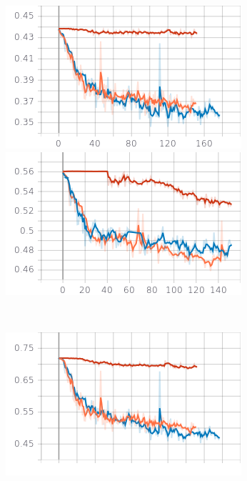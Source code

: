 \documentclass{article}
\begin{document}
\begin{figure}[hbt!]
	\begin{minipage}{.5\textwidth}
	  \centering
	  \includegraphics[width=\linewidth]{images/doa_score_ov1.png}
	
	\end{minipage}%
	\begin{minipage}{.5\textwidth}
	  \centering
	  \includegraphics[width=\linewidth]{images/doa_score_ov2.png}
	\end{minipage}\\
	\vspace{1em}
	\begin{minipage}{.5\textwidth}
	  \centering
	  \includegraphics[width=\linewidth]{images/seld_score_ov1.png}
	

\end{minipage}
\end{figure}
\end{document}
